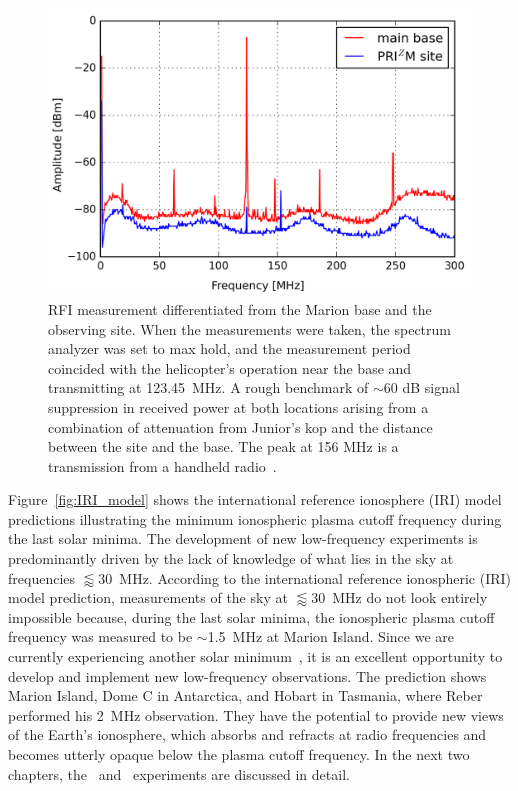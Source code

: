 \begin{figure}
	\centering
	\includegraphics[width=\linewidth]{Figures/rfi}
	\caption{RFI measurement differentiated from the Marion base and the \prizm observing site. When the measurements were taken, the spectrum analyzer was set to max hold, and the measurement period coincided with the helicopter's operation near the base and transmitting at \SI{123.45}{\mega\hertz}. A rough benchmark of $\sim$60 dB signal suppression in received power at both locations arising from a combination of attenuation from Junior's kop and the distance between the \prizm site and the base. The peak at 156 MHz is a transmission from a handheld radio~\citep{2019JAI.....850004P}.}
	\label{fig:rfi}
\end{figure}

Figure~\ref{fig:IRI_model} shows the international reference ionosphere (IRI) model~\citep{ars-16-1-2018} predictions illustrating the minimum ionospheric plasma cutoff frequency during the last solar minima. The development of new low-frequency experiments is predominantly driven by the lack of knowledge of what lies in the sky at frequencies $\lessapprox$\SI{30}{\mega\hertz}.  According to the international reference ionospheric (IRI) model prediction, measurements of the sky at $\lessapprox$\SI{30}{\mega\hertz} do not look entirely impossible because, during the last solar minima, the ionospheric plasma cutoff frequency was measured to be $\sim$\SI{1.5}{\mega\hertz} at Marion Island. Since we are currently experiencing another solar minimum~\citep{2018NatCo...9.5209B}, it is an excellent opportunity to develop and implement new low-frequency observations. The prediction shows Marion Island, Dome C in Antarctica, and Hobart in Tasmania, where Reber performed his \SI{2}{\mega\hertz} observation. They have the potential to provide new views of the Earth's ionosphere, which absorbs and refracts at radio frequencies and becomes utterly opaque below the plasma cutoff frequency. In the next two chapters, the \prizm\ and \albatros\ experiments are discussed in detail.

